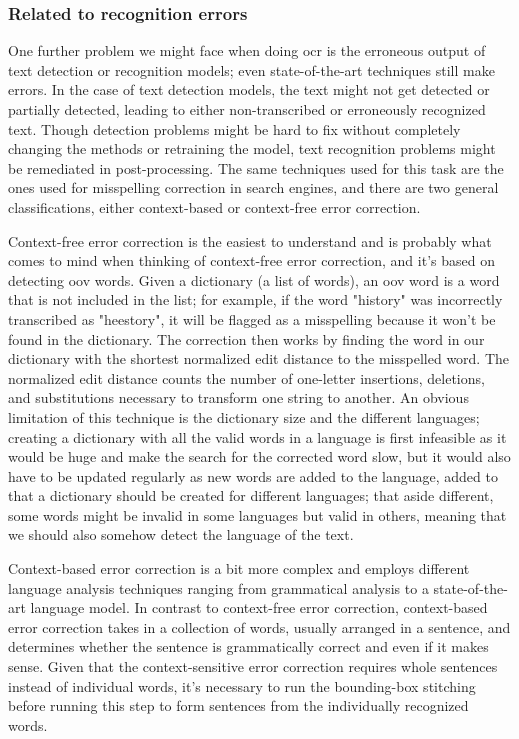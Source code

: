 \subsubsection*{Related to recognition errors}

One further problem we might face when doing \gls{ocr} is the erroneous output of text detection or recognition models; even state-of-the-art techniques still make errors. In the case of text detection models, the text might not get detected or partially detected, leading to either non-transcribed or erroneously recognized text. Though detection problems might be hard to fix without completely changing the methods or retraining the model, text recognition problems might be remediated in post-processing. The same techniques used for this task are the ones used for misspelling correction in search engines, and there are two general classifications, either context-based or context-free error correction.

Context-free error correction is the easiest to understand and is probably what comes to mind when thinking of context-free error correction, and it's based on detecting \gls{oov} words. Given a dictionary (a list of words), an \gls{oov} word is a word that is not included in the list; for example, if the word "history" was incorrectly transcribed as "heestory", it will be flagged as a misspelling because it won't be found in the dictionary. The correction then works by finding the word in our dictionary with the shortest normalized edit distance to the misspelled word. The normalized edit distance \cite{yujian_normalized_2007} counts the number of one-letter insertions, deletions, and substitutions necessary to transform one string to another. An obvious limitation of this technique is the dictionary size and the different languages; creating a dictionary with all the valid words in a language is first infeasible as it would be huge and make the search for the corrected word slow, but it would also have to be updated regularly as new words are added to the language, added to that a dictionary should be created for different languages; that aside different, some words might be invalid in some languages but valid in others, meaning that we should also somehow detect the language of the text.

Context-based error correction is a bit more complex and employs different language analysis techniques ranging from grammatical analysis to a state-of-the-art language model. In contrast to context-free error correction, context-based error correction takes in a collection of words, usually arranged in a sentence, and determines whether the sentence is grammatically correct and even if it makes sense. Given that the context-sensitive error correction requires whole sentences instead of individual words, it's necessary to run the bounding-box stitching before running this step to form sentences from the individually recognized words. 
